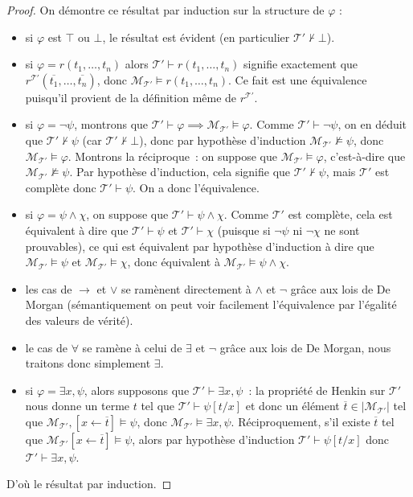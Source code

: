 \begin{proof}
  On démontre ce résultat par induction sur la structure de $\varphi$ :
  \begin{itemize}
  \item si $\varphi$ est $\top$ ou $\bot$, le résultat est évident (en
    particulier $\mathcal T'\not\vdash\bot$).
  \item si $\varphi = r(t_1,\ldots,t_n)$ alors
    $\mathcal T'\vdash r(t_1,\ldots,t_n)$ signifie exactement que
    $r^{\mathcal T'}(\overline{t_1},\ldots,\overline{t_n})$, donc
    $\mathcal M_{\mathcal T'}\models r(t_1,\ldots,t_n)$. Ce fait est une
    équivalence puisqu'il provient de la définition même de $r^{\mathcal T'}$.
  \item si $\varphi = \lnot \psi$, montrons que
    $\mathcal T'\vdash\varphi\implies \mathcal M_{\mathcal T'}\models \varphi$.
    Comme $\mathcal T'\vdash \lnot \psi$, on en déduit que
    $\mathcal T'\nvdash \psi$ (car $\mathcal T'\nvdash\bot$), donc par
    hypothèse d'induction $\mathcal M_{\mathcal T'}\not\models \psi$, donc
    $\mathcal M_{\mathcal T'}\models \varphi$. Montrons la réciproque~: on
    suppose que $\mathcal M_{\mathcal T'}\models \varphi$, c'est-à-dire que
    $\mathcal M_{\mathcal T'}\not\models \psi$. Par hypothèse d'induction, cela
    signifie que $\mathcal T'\nvdash \psi$, mais $\mathcal T'$ est complète
    donc $\mathcal T'\vdash\psi$. On a donc l'équivalence.
  \item si $\varphi = \psi \land \chi$, on suppose que
    $\mathcal T'\vdash \psi\land\chi$. Comme $\mathcal T'$ est complète, cela
    est équivalent à dire que $\mathcal T'\vdash \psi$ et
    $\mathcal T'\vdash \chi$ (puisque si $\lnot\psi$ ni $\lnot \chi$ ne sont
    prouvables), ce qui est équivalent par hypothèse d'induction à dire que
    $\mathcal M_{\mathcal T'}\models\psi$ et
    $\mathcal M_{\mathcal T'}\models\chi$, donc équivalent à
    $\mathcal M_{\mathcal T'}\models \psi\land \chi$.
  \item les cas de $\to$ et $\lor$ se ramènent directement à $\land$ et $\lnot$
    grâce aux lois de De Morgan (sémantiquement on peut voir facilement
    l'équivalence par l'égalité des valeurs de vérité).
  \item le cas de $\forall$ se ramène à celui de $\exists$ et $\lnot$ grâce
    aux lois de De Morgan, nous traitons donc simplement $\exists$.
  \item si $\varphi = \exists x, \psi$, alors supposons que
    $\mathcal T'\vdash \exists x, \psi$~: la propriété de Henkin sur
    $\mathcal T'$ nous donne un terme $t$ tel que $\mathcal T'\vdash \psi[t/x]$
    et donc un élément $\overline t \in |\mathcal M_{\mathcal T'}|$ tel que
    $\mathcal M_{\mathcal T'}, [x\leftarrow \overline t] \models \psi$, donc
    $\mathcal M_{\mathcal T'}\models \exists x, \psi$. Réciproquement, s'il
    existe $\overline t$ tel que
    $\mathcal M_{\mathcal T'}[x\leftarrow \overline t]\models \psi$, alors
    par hypothèse d'induction $\mathcal T'\vdash \psi[t/x]$ donc
    $\mathcal T'\vdash \exists x, \psi$.
  \end{itemize}

  D'où le résultat par induction.
\end{proof}

